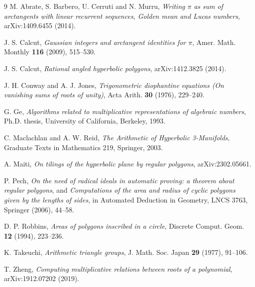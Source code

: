 \documentclass[11pt,a4paper]{article}
\theoremstyle{plain}
\theoremstyle{definition}
\theoremstyle{remark}
\begin{document}
\begin{thebibliography}{9}
M. Abrate, S. Barbero, U. Cerruti and N. Murru,
\emph{Writing $\pi$ as sum of arctangents with linear recurrent sequences, Golden
mean and Lucas numbers}, arXiv:1409.6455 (2014).

J. S. Calcut,
\emph{Gaussian integers and arctangent identities for $\pi$},
Amer. Math. Monthly \textbf{116} (2009), 515--530.

J. S. Calcut,
\emph{Rational angled hyperbolic polygons}, arXiv:1412.3825 (2014).

J. H. Conway and A. J. Jones,
\emph{Trigonometric diophantine equations (On vanishing sums of roots of unity)},
Acta Arith. \textbf{30} (1976), 229--240.

G. Ge,
\emph{Algorithms related to multiplicative representations of algebraic numbers},
Ph.D. thesis, University of California, Berkeley, 1993.

C. Maclachlan and A. W. Reid,
\emph{The Arithmetic of Hyperbolic 3-Manifolds},
Graduate Texts in Mathematics 219, Springer, 2003.

A. Maiti,
\emph{On tilings of the hyperbolic plane by regular polygons}, arXiv:2302.05661.

P. Pech,
\emph{On the need of radical ideals in automatic proving: a theorem about
regular polygons}, and \emph{Computations of the area and radius of cyclic
polygons given by the lengths of sides}, in Automated Deduction in Geometry,
LNCS 3763, Springer (2006), 44--58.

D. P. Robbins,
\emph{Areas of polygons inscribed in a circle},
Discrete Comput. Geom. \textbf{12} (1994), 223--236.

K. Takeuchi,
\emph{Arithmetic triangle groups},
J. Math. Soc. Japan \textbf{29} (1977), 91--106.

T. Zheng,
\emph{Computing multiplicative relations between roots of a polynomial},
arXiv:1912.07202 (2019).
\end{thebibliography}
\end{document}
